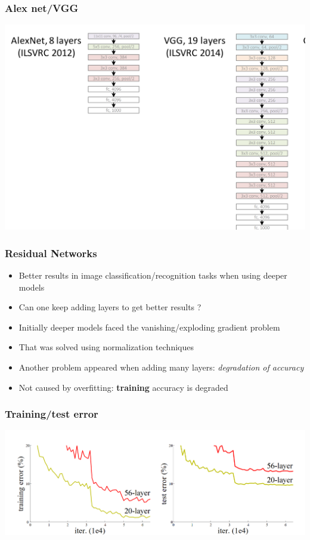 \documentclass{beamer}
\begin{document}
\begin{frame}
    \frametitle{Alex net/VGG}
    \includegraphics[width=\textwidth]{figs/alex-vgg.png}
   \href{https://icml.cc/2016/tutorials/icml2016_tutorial_deep_residual_networks_kaiminghe.pdf}{}
\end{frame}

\begin{frame}
	\frametitle{Residual Networks}
\begin{itemize}
	\item Better results in image classification/recognition tasks when using deeper models 
	\item Can one keep adding layers  to get better results ?
	\item Initially deeper models faced the vanishing/exploding gradient problem
	\item That was solved using normalization techniques
	\item Another problem appeared when adding many layers: \textit{degradation of accuracy}
	\item Not caused by overfitting: \textbf{training} accuracy is degraded 
\end{itemize}
\end{frame}

\begin{frame}
    \frametitle{Training/test error}
\begin{center}
    \includegraphics[width=\textwidth]{figs/deeper-error.png}
\end{center}

\end{frame}
\end{document}
